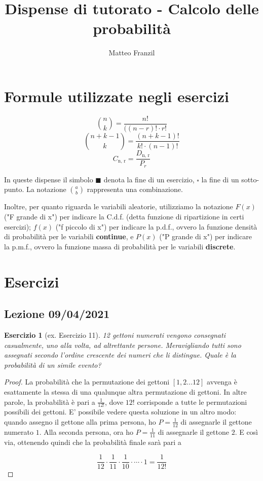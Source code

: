 \documentclass[12pt]{article}
\newtheorem{theorem}{Esercizio}
\begin{document}
\title{Dispense di tutorato - Calcolo delle probabilità}
\author{Matteo Franzil}
\maketitle

\tableofcontents

\newpage
\section{Formule utilizzate negli esercizi}

$$
{n \choose k} = \frac{n!}{((n-r)! \cdot r!}
$$
$$
{n + k - 1 \choose k} = \frac{(n + k - 1)!}{k! \cdot (n - 1)!}
$$
$$
C_{\text{n, r}} = \frac{D_{\text{n, r}}}{P_r}
$$

In queste dispense il simbolo $\blacksquare$ denota la fine di un esercizio, $\square$ la fine di un sotto-punto. La notazione ${a \choose b}$ rappresenta una combinazione.

Inoltre, per quanto riguarda le variabili aleatorie, utilizziamo la notazione $F(x)$ ("F grande di x") per indicare la C.d.f. (detta funzione di ripartizione in certi esercizi); $f(x)$ ("f piccolo di x") per indicare la p.d.f., ovvero la funzione densità di probabilità per le variabili \textbf{continue}, e $P(x)$ ("P grande di x") per indicare la p.m.f., ovvero la funzione massa di probabilità per le variabili \textbf{discrete}.


\section{Esercizi}
\subsection{Lezione 09/04/2021}

\begin{theorem}[ex. Esercizio 11]
12 gettoni numerati vengono consegnati casualmente, uno alla volta, ad altrettante persone. Meravigliando tutti sono assegnati secondo l'ordine crescente dei numeri che li distingue. Quale è la probabilità di un simile evento?
\end{theorem}

\begin{proof}
La probabilità che la permutazione dei gettoni $[1, 2...12]$ avvenga è esattamente la stessa di una qualunque altra permutazione di gettoni. In altre parole, la probabilità è pari a $\frac{1}{12!}$, dove $12!$ corrisponde a tutte le permutazioni possibili dei gettoni. E' possibile vedere questa soluzione in un altro modo: quando assegno il gettone alla prima persona, ho $P = \frac{1}{12}$ di assegnarle il gettone numerato $1$. Alla seconda persona, ora ho $P =\frac{1}{11}$ di assegnarle il gettone $2$. E così via, ottenendo quindi che la probabilità finale sarà pari a 

$$\frac{1}{12} \cdot \frac{1}{11} \cdot \frac{1}{10} \cdot \cdots \cdot 1 = \frac{1}{12!}
$$

\end{proof}
\end{document}
